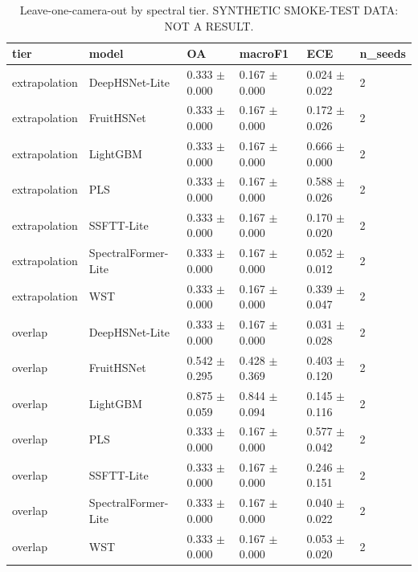 \begin{table}[t]
\centering
\caption{Leave-one-camera-out by spectral tier. SYNTHETIC SMOKE-TEST DATA: NOT A RESULT.}
\label{tab:table_deephs_loco_by_tier}
\begin{tabular}{llllll}
\hline
tier & model & OA & macroF1 & ECE & n\_seeds \\
\hline
extrapolation & DeepHSNet-Lite & 0.333 $\pm$ 0.000 & 0.167 $\pm$ 0.000 & 0.024 $\pm$ 0.022 & 2 \\
extrapolation & FruitHSNet & 0.333 $\pm$ 0.000 & 0.167 $\pm$ 0.000 & 0.172 $\pm$ 0.026 & 2 \\
extrapolation & LightGBM & 0.333 $\pm$ 0.000 & 0.167 $\pm$ 0.000 & 0.666 $\pm$ 0.000 & 2 \\
extrapolation & PLS & 0.333 $\pm$ 0.000 & 0.167 $\pm$ 0.000 & 0.588 $\pm$ 0.026 & 2 \\
extrapolation & SSFTT-Lite & 0.333 $\pm$ 0.000 & 0.167 $\pm$ 0.000 & 0.170 $\pm$ 0.020 & 2 \\
extrapolation & SpectralFormer-Lite & 0.333 $\pm$ 0.000 & 0.167 $\pm$ 0.000 & 0.052 $\pm$ 0.012 & 2 \\
extrapolation & WST & 0.333 $\pm$ 0.000 & 0.167 $\pm$ 0.000 & 0.339 $\pm$ 0.047 & 2 \\
overlap & DeepHSNet-Lite & 0.333 $\pm$ 0.000 & 0.167 $\pm$ 0.000 & 0.031 $\pm$ 0.028 & 2 \\
overlap & FruitHSNet & 0.542 $\pm$ 0.295 & 0.428 $\pm$ 0.369 & 0.403 $\pm$ 0.120 & 2 \\
overlap & LightGBM & 0.875 $\pm$ 0.059 & 0.844 $\pm$ 0.094 & 0.145 $\pm$ 0.116 & 2 \\
overlap & PLS & 0.333 $\pm$ 0.000 & 0.167 $\pm$ 0.000 & 0.577 $\pm$ 0.042 & 2 \\
overlap & SSFTT-Lite & 0.333 $\pm$ 0.000 & 0.167 $\pm$ 0.000 & 0.246 $\pm$ 0.151 & 2 \\
overlap & SpectralFormer-Lite & 0.333 $\pm$ 0.000 & 0.167 $\pm$ 0.000 & 0.040 $\pm$ 0.022 & 2 \\
overlap & WST & 0.333 $\pm$ 0.000 & 0.167 $\pm$ 0.000 & 0.053 $\pm$ 0.020 & 2 \\
\hline
\end{tabular}
\end{table}
